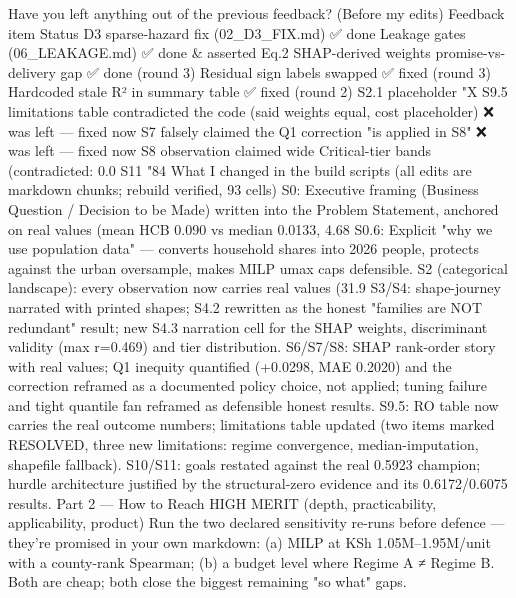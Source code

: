 Have you left anything out of the previous feedback? (Before my edits)
Feedback item	Status
D3 sparse-hazard fix (02_D3_FIX.md)	✅ done
Leakage gates (06_LEAKAGE.md)	✅ done & asserted
Eq.2 SHAP-derived weights promise-vs-delivery gap	✅ done (round 3)
Residual sign labels swapped	✅ fixed (round 3)
Hardcoded stale R² in summary table	✅ fixed (round 2)
S2.1 placeholder "X%
S9.5 limitations table contradicted the code (said weights equal, cost placeholder)	❌ was left — fixed now
S7 falsely claimed the Q1 correction "is applied in S8"	❌ was left — fixed now
S8 observation claimed wide Critical-tier bands (contradicted: 0.0%
S11 "84%
What I changed in the build scripts (all edits are markdown chunks; rebuild verified, 93 cells)
S0: Executive framing (Business Question / Decision to be Made) written into the Problem Statement, anchored on real values (mean HCB 0.090 vs median 0.0133, 4.68%
S0.6: Explicit "why we use population data" — converts household shares into 2026 people, protects against the urban oversample, makes MILP umax caps defensible.
S2 (categorical landscape): every observation now carries real values (31.9%
S3/S4: shape-journey narrated with printed shapes; S4.2 rewritten as the honest "families are NOT redundant" result; new S4.3 narration cell for the SHAP weights, discriminant validity (max r=0.469) and tier distribution.
S6/S7/S8: SHAP rank-order story with real values; Q1 inequity quantified (+0.0298, MAE 0.2020) and the correction reframed as a documented policy choice, not applied; tuning failure and tight quantile fan reframed as defensible honest results.
S9.5: RO table now carries the real outcome numbers; limitations table updated (two items marked RESOLVED, three new limitations: regime convergence, median-imputation, shapefile fallback).
S10/S11: goals restated against the real 0.5923 champion; hurdle architecture justified by the structural-zero evidence and its 0.6172/0.6075 results.
Part 2 — How to Reach HIGH MERIT (depth, practicability, applicability, product)
Run the two declared sensitivity re-runs before defence — they're promised in your own markdown: (a) MILP at KSh 1.05M–1.95M/unit with a county-rank Spearman; (b) a budget level where Regime A ≠ Regime B. Both are cheap; both close the biggest remaining "so what" gaps.

